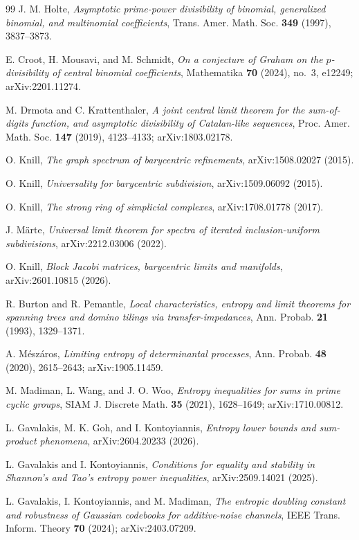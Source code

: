 \documentclass[11pt]{article}
\theoremstyle{definition}
\begin{document}
\begin{thebibliography}{99}
 J. M. Holte, \emph{Asymptotic prime-power divisibility of binomial, generalized binomial, and multinomial coefficients}, Trans. Amer. Math. Soc. \textbf{349} (1997), 3837--3873.

 E. Croot, H. Mousavi, and M. Schmidt, \emph{On a conjecture of Graham on the $p$-divisibility of central binomial coefficients}, Mathematika \textbf{70} (2024), no.~3, e12249; arXiv:2201.11274.

 M. Drmota and C. Krattenthaler, \emph{A joint central limit theorem for the sum-of-digits function, and asymptotic divisibility of Catalan-like sequences}, Proc. Amer. Math. Soc. \textbf{147} (2019), 4123--4133; arXiv:1803.02178.

 O. Knill, \emph{The graph spectrum of barycentric refinements}, arXiv:1508.02027 (2015).

 O. Knill, \emph{Universality for barycentric subdivision}, arXiv:1509.06092 (2015).

 O. Knill, \emph{The strong ring of simplicial complexes}, arXiv:1708.01778 (2017).

 J. M\"arte, \emph{Universal limit theorem for spectra of iterated inclusion-uniform subdivisions}, arXiv:2212.03006 (2022).

 O. Knill, \emph{Block Jacobi matrices, barycentric limits and manifolds}, arXiv:2601.10815 (2026).

 R. Burton and R. Pemantle, \emph{Local characteristics, entropy and limit theorems for spanning trees and domino tilings via transfer-impedances}, Ann. Probab. \textbf{21} (1993), 1329--1371.

 A. M\'esz\'aros, \emph{Limiting entropy of determinantal processes}, Ann. Probab. \textbf{48} (2020), 2615--2643; arXiv:1905.11459.

 M. Madiman, L. Wang, and J. O. Woo, \emph{Entropy inequalities for sums in prime cyclic groups}, SIAM J. Discrete Math. \textbf{35} (2021), 1628--1649; arXiv:1710.00812.

 L. Gavalakis, M. K. Goh, and I. Kontoyiannis, \emph{Entropy lower bounds and sum-product phenomena}, arXiv:2604.20233 (2026).

 L. Gavalakis and I. Kontoyiannis, \emph{Conditions for equality and stability in Shannon's and Tao's entropy power inequalities}, arXiv:2509.14021 (2025).

 L. Gavalakis, I. Kontoyiannis, and M. Madiman, \emph{The entropic doubling constant and robustness of Gaussian codebooks for additive-noise channels}, IEEE Trans. Inform. Theory \textbf{70} (2024); arXiv:2403.07209.


\end{thebibliography}
\end{document}
